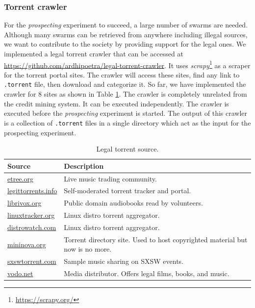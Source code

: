 \subsubsection{Torrent crawler}
For the \textit{prospecting} experiment to succeed, a large number of swarms are needed. Although many swarms can be retrieved from anywhere including illegal sources, we want to contribute to the society by providing support for the legal ones. We implemented a legal torrent crawler that can be accessed at \url{https://github.com/ardhipoetra/legal-torrent-crawler}. It uses \textit{scrapy}\footnote{\url{https://scrapy.org/}} as a scraper for the torrent portal sites. The crawler will access these sites, find any link to \texttt{.torrent} file, then download and categorize it. So far, we have implemented the crawler for 8 sites as shown in Table \ref{tbl:legaltorrentsource}. The crawler is completely unrelated from the credit mining system. It can be executed independently. The crawler is executed before the \textit{prospecting} experiment is started. The output of this crawler is a collection of \texttt{.torrent} files in a single directory which act as the input for the prospecting experiment.

\begin{table}[h]
	\centering
	\caption{Legal torrent source.}
	\label{tbl:legaltorrentsource}
	\begin{tabular}{lp{8.5cm}}
		\hline
		Source & Description \\ \hline
		\url{etree.org} & Live music trading community. \\
		\url{legittorrents.info} & Self-moderated torrent tracker and portal. \\
		\url{librivox.org} & Public domain audiobooks read by volunteers. \\
		\url{linuxtracker.org} & Linux distro torrent aggregator. \\
		\url{distrowatch.com} & Linux distro torrent aggregator. \\
		\url{mininova.org} & Torrent directory site. Used to host copyrighted material but now is no more.\\
		\url{sxswtorrent.com} & Sample music sharing on SXSW events. \\
		\url{vodo.net} & Media distributor. Offers legal films, books, and music.
	\end{tabular}
\end{table}

%
